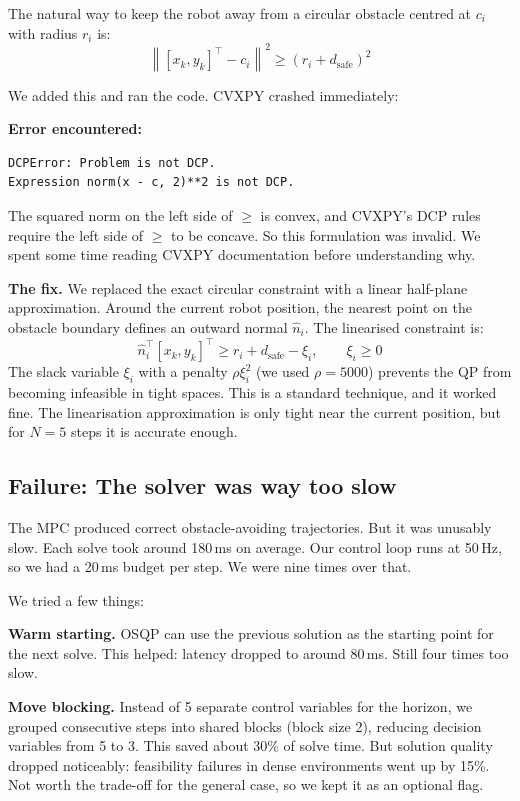 \documentclass[12pt,a4paper]{article}
\newcommand{\norm}[1]{\left\lVert#1\right\rVert}
\begin{document}
The natural way to keep the robot away from a circular obstacle centred at
$c_i$ with radius $r_i$ is:
\[
  \norm{[x_k, y_k]^\top - c_i}^2 \geq (r_i + d_{\text{safe}})^2
\]

We added this and ran the code. CVXPY crashed immediately:

\begin{failbox}
\textbf{Error encountered:}
\begin{verbatim}
DCPError: Problem is not DCP.
Expression norm(x - c, 2)**2 is not DCP.
\end{verbatim}
The squared norm on the left side of $\geq$ is convex, and CVXPY's DCP
rules require the left side of $\geq$ to be concave. So this formulation
was invalid. We spent some time reading CVXPY documentation before
understanding why.
\end{failbox}

\textbf{The fix.} We replaced the exact circular constraint with a linear
half-plane approximation. Around the current robot position, the nearest
point on the obstacle boundary defines an outward normal $\hat{n}_i$. The
linearised constraint is:
\[
  \hat{n}_i^\top [x_k, y_k]^\top \geq r_i + d_{\text{safe}} - \xi_i,
  \qquad \xi_i \geq 0
\]
The slack variable $\xi_i$ with a penalty $\rho \xi_i^2$ (we used
$\rho = 5000$) prevents the QP from becoming infeasible in tight spaces.
This is a standard technique, and it worked fine. The linearisation
approximation is only tight near the current position, but for $N=5$
steps it is accurate enough.

\subsection{Failure: The solver was way too slow}

The MPC produced correct obstacle-avoiding trajectories. But it was unusably
slow. Each solve took around 180\,ms on average. Our control loop runs at
50\,Hz, so we had a 20\,ms budget per step. We were nine times over that.

We tried a few things:

\medskip
\noindent\textbf{Warm starting.} OSQP can use the previous solution as the
starting point for the next solve. This helped: latency dropped to around
80\,ms. Still four times too slow.

\medskip
\noindent\textbf{Move blocking.} Instead of 5 separate control variables
for the horizon, we grouped consecutive steps into shared blocks
(block size 2), reducing decision variables from 5 to 3. This saved about
30\% of solve time. But solution quality dropped noticeably: feasibility
failures in dense environments went up by 15\%. Not worth the trade-off
for the general case, so we kept it as an optional flag.
\end{document}
